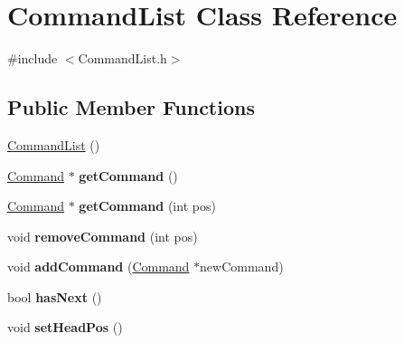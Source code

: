 \hypertarget{class_command_list}{}\section{Command\+List Class Reference}
\label{class_command_list}


{\ttfamily \#include $<$Command\+List.\+h$>$}

\subsection*{Public Member Functions}
\begin{DoxyCompactItemize}
\item 
\hyperlink{class_command_list_aa5cc72c5c68da1d3e18f808da93025c6}{Command\+List} ()
\item 
\hypertarget{class_command_list_a0e24076e79f1ebe5a8cf3992873603fa}{}\hyperlink{class_command}{Command} $\ast$ {\bfseries get\+Command} ()\label{class_command_list_a0e24076e79f1ebe5a8cf3992873603fa}

\item 
\hypertarget{class_command_list_a5d11d429c550a38d9ba77ad8bc717ab9}{}\hyperlink{class_command}{Command} $\ast$ {\bfseries get\+Command} (int pos)\label{class_command_list_a5d11d429c550a38d9ba77ad8bc717ab9}

\item 
\hypertarget{class_command_list_a7faf17dcf8101bf2787ddde0e4a81353}{}void {\bfseries remove\+Command} (int pos)\label{class_command_list_a7faf17dcf8101bf2787ddde0e4a81353}

\item 
\hypertarget{class_command_list_a01627f4070f628f40b3a46bed51afc86}{}void {\bfseries add\+Command} (\hyperlink{class_command}{Command} $\ast$new\+Command)\label{class_command_list_a01627f4070f628f40b3a46bed51afc86}

\item 
\hypertarget{class_command_list_a8482ecf6e3a1c11e863fc007d6bf3365}{}bool {\bfseries has\+Next} ()\label{class_command_list_a8482ecf6e3a1c11e863fc007d6bf3365}

\item 
\hypertarget{class_command_list_a894298803e476f35ac17ab1424a11922}{}void {\bfseries set\+Head\+Pos} ()\label{class_command_list_a894298803e476f35ac17ab1424a11922}

\end{DoxyCompactItemize}

